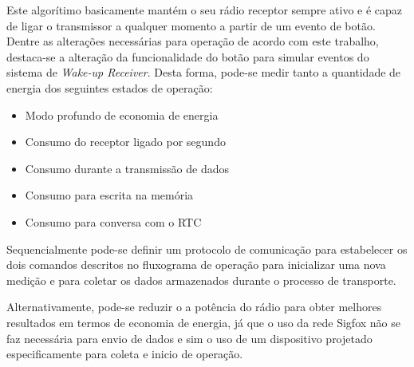 Este algorítimo basicamente mantém o seu rádio receptor sempre ativo e é capaz de ligar o transmissor a qualquer momento a partir de um evento de botão. Dentre as alterações necessárias para operação de acordo com este trabalho, destaca-se a alteração da funcionalidade do botão para simular eventos do sistema de \textit{Wake-up Receiver}. Desta forma, pode-se medir tanto a quantidade de energia dos seguintes estados de operação:
\begin{itemize}
    \item Modo profundo de economia de energia
    \item Consumo do receptor ligado por segundo
    \item Consumo durante a transmissão de dados
    \item Consumo para escrita na memória
    \item Consumo para conversa com o RTC
\end{itemize}

Sequencialmente pode-se definir um protocolo de comunicação para estabelecer os dois comandos descritos no fluxograma de operação para inicializar uma nova medição e para coletar os dados armazenados durante o processo de transporte.

Alternativamente, pode-se reduzir o a potência do rádio para obter melhores resultados em termos de economia de energia, já que o uso da rede Sigfox não se faz necessária para envio de dados e sim o uso de um dispositivo projetado especificamente para coleta e inicio de operação.

